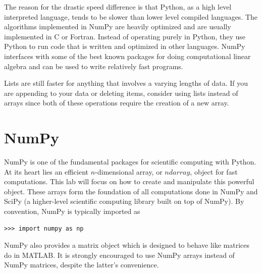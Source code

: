 %

The reason for the drastic speed difference is that Python, as a high level interpreted language, tends to be slower than lower level compiled languages.
The algorithms implemented in NumPy are heavily optimized and are usually implemented in C or Fortran.
Instead of operating purely in Python, they use Python to run code that is written and optimized in other languages.
NumPy interfaces with some of the best known packages for doing computational linear algebra and can be used to write relatively fast programs.

Lists are still faster for anything that involves a varying lengths of data.
If you are appending to your data or deleting items, consider using lists instead of arrays since both of these operations require the creation of a new array.

\section*{NumPy}
NumPy is one of the fundamental packages for scientific computing with Python.
At its heart lies an efficient $n$-dimensional array, or $ndarray$, object for fast computations.
This lab will focus on how to create and manipulate this powerful object.
These arrays form the foundation of all computations done in NumPy and SciPy (a higher-level scientific computing library built on top of NumPy).
By convention, NumPy is typically imported as
\begin{lstlisting}
>>> import numpy as np
\end{lstlisting}
NumPy also provides a matrix object which is designed to behave like matrices do in MATLAB.
It is strongly encouraged to use NumPy arrays instead of NumPy matrices, despite the latter's convenience.


